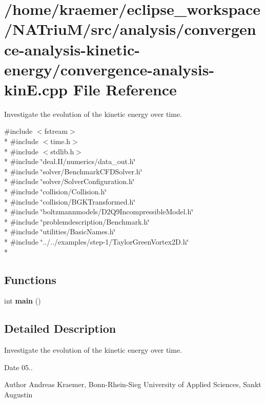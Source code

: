 \hypertarget{convergence-analysis-kinE_8cpp}{\section{/home/kraemer/eclipse\-\_\-workspace/\-N\-A\-Triu\-M/src/analysis/convergence-\/analysis-\/kinetic-\/energy/convergence-\/analysis-\/kin\-E.cpp File Reference}
\label{convergence-analysis-kinE_8cpp}
}


Investigate the evolution of the kinetic energy over time.  


{\ttfamily \#include $<$fstream$>$}\\*
{\ttfamily \#include $<$time.\-h$>$}\\*
{\ttfamily \#include $<$stdlib.\-h$>$}\\*
{\ttfamily \#include \char`\"{}deal.\-I\-I/numerics/data\-\_\-out.\-h\char`\"{}}\\*
{\ttfamily \#include \char`\"{}solver/\-Benchmark\-C\-F\-D\-Solver.\-h\char`\"{}}\\*
{\ttfamily \#include \char`\"{}solver/\-Solver\-Configuration.\-h\char`\"{}}\\*
{\ttfamily \#include \char`\"{}collision/\-Collision.\-h\char`\"{}}\\*
{\ttfamily \#include \char`\"{}collision/\-B\-G\-K\-Transformed.\-h\char`\"{}}\\*
{\ttfamily \#include \char`\"{}boltzmannmodels/\-D2\-Q9\-Incompressible\-Model.\-h\char`\"{}}\\*
{\ttfamily \#include \char`\"{}problemdescription/\-Benchmark.\-h\char`\"{}}\\*
{\ttfamily \#include \char`\"{}utilities/\-Basic\-Names.\-h\char`\"{}}\\*
{\ttfamily \#include \char`\"{}../../examples/step-\/1/\-Taylor\-Green\-Vortex2\-D.\-h\char`\"{}}\\*
\subsection*{Functions}
\begin{DoxyCompactItemize}
\item 
\hypertarget{convergence-analysis-kinE_8cpp_ae66f6b31b5ad750f1fe042a706a4e3d4}{int {\bfseries main} ()}\label{convergence-analysis-kinE_8cpp_ae66f6b31b5ad750f1fe042a706a4e3d4}

\end{DoxyCompactItemize}


\subsection{Detailed Description}
Investigate the evolution of the kinetic energy over time. \begin{DoxyDate}{Date}
05.. 
\end{DoxyDate}
\begin{DoxyAuthor}{Author}
Andreas Kraemer, Bonn-\/\-Rhein-\/\-Sieg University of Applied Sciences, Sankt Augustin 
\end{DoxyAuthor}
